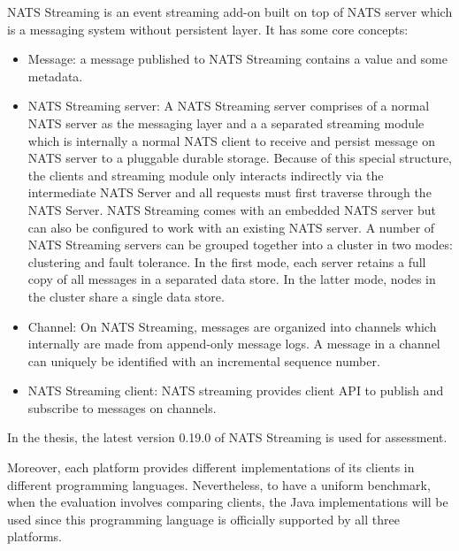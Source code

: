 NATS Streaming is an event streaming add-on built on top of NATS server which is a messaging system without persistent layer. It has some core concepts:
\begin{itemize}
	\item Message: a message published to NATS Streaming contains a value and some metadata.	
	\item NATS Streaming server: A NATS Streaming server comprises of a normal NATS server as the messaging layer and a a separated streaming module which is internally a normal NATS client to receive and persist message on NATS server to a pluggable durable storage.  Because of this special structure, the clients and streaming module only interacts indirectly via the intermediate NATS Server and all requests must first traverse through the NATS Server. NATS Streaming comes with an embedded NATS server but can also be configured to work with an existing NATS server. A number of NATS Streaming servers can be grouped together into a cluster in two modes: clustering and fault tolerance. In the first mode, each server retains a full copy of all messages in a separated data store. In the latter mode, nodes in the cluster share a single data store.
	\item Channel: On NATS Streaming, messages are organized into channels which internally are made from append-only message logs. A message in a channel can uniquely be identified with an incremental sequence number.
	\item NATS Streaming client: NATS streaming provides client API to publish and subscribe to messages on channels.  
\end{itemize}
In the thesis, the latest version 0.19.0 of NATS Streaming is used for assessment.

Moreover, each platform provides different implementations of its clients in different programming languages. Nevertheless, to have a uniform benchmark, when the evaluation involves comparing clients, the Java implementations will be used since this programming language is officially supported by all three platforms.











